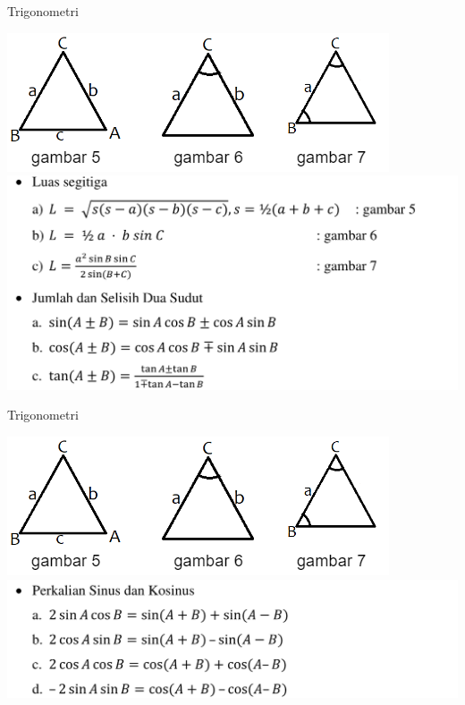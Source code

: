 \documentclass[pdflatex,compress,mathserif]{beamer}
\begin{document}
	\begin{frame}{Trigonometri}
		\begin{center}
			\includegraphics[width=0.5\linewidth]{pict/26}
			\includegraphics[width=0.9\linewidth]{pict/28}
		\end{center}
	\end{frame}

	\begin{frame}{Trigonometri}
		\begin{center}
			\includegraphics[width=0.5\linewidth]{pict/26}
			\includegraphics[width=0.9\linewidth]{pict/29}
		\end{center}
	\end{frame}
\end{document}
